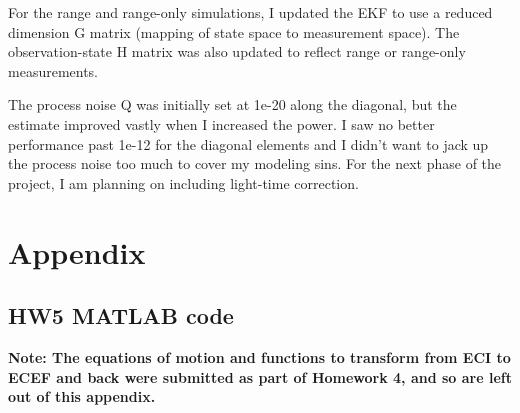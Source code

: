 \documentclass[conf]{new-aiaa}
\begin{document}
For the range and range-only simulations, I updated the EKF to use a reduced dimension G matrix (mapping of state space to measurement space). The observation-state H matrix was also updated to reflect range or range-only measurements. 

The process noise Q was initially set at 1e-20 along the diagonal, but the estimate improved vastly when I increased the power. I saw no better performance past 1e-12 for the diagonal elements and I didn't want to jack up the process noise too much to cover my modeling sins. For the next phase of the project, I am planning on including light-time correction. 




\newpage
\section*{Appendix} 

\subsection*{HW5 MATLAB code} 

\textbf{Note: The equations of motion and functions to transform from ECI to ECEF and back were submitted as part of Homework 4, and so are left out of this appendix.}
\end{document}
